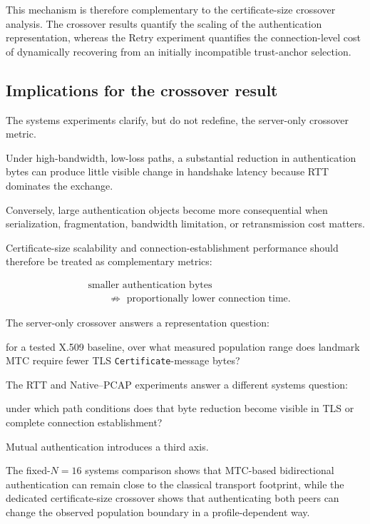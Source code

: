 \documentclass[journal]{IEEEtran}
\begin{document}
This mechanism is therefore complementary to the certificate-size crossover
analysis. The crossover results quantify the scaling of the authentication
representation, whereas the Retry experiment quantifies the connection-level
cost of dynamically recovering from an initially incompatible trust-anchor
selection.





\subsection{Implications for the crossover result}

The systems experiments clarify, but do not redefine, the server-only crossover metric.

Under high-bandwidth, low-loss paths, a substantial reduction in authentication bytes can produce little visible change in handshake latency because RTT dominates the exchange.

Conversely, large authentication objects become more consequential when serialization, fragmentation, bandwidth limitation, or retransmission cost matters.



Certificate-size scalability and connection-establishment performance should therefore be treated as complementary metrics:

\begin{equation}
\begin{aligned}
&\text{smaller authentication bytes}\\
&\qquad\not\Rightarrow\text{ proportionally lower connection time}.
\end{aligned}
\end{equation}



The server-only crossover answers a representation question:

for a tested X.509 baseline, over what measured population range does landmark MTC require fewer TLS \texttt{Certificate}-message bytes?

The RTT and Native--PCAP experiments answer a different systems question:

under which path conditions does that byte reduction become visible in TLS or complete connection establishment?



Mutual authentication introduces a third axis.

The fixed-$N=16$ systems comparison shows that MTC-based bidirectional authentication can remain close to the classical transport footprint, while the dedicated certificate-size crossover shows that authenticating both peers can change the observed population boundary in a profile-dependent way.
\end{document}
